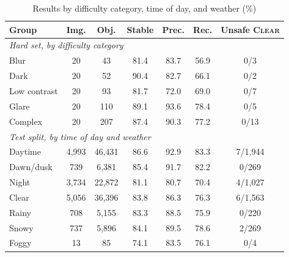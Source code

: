 \begin{table}[t]
\centering
\caption{Results by difficulty category, time of day, and weather (\%)}
\label{tab:groups}
\footnotesize
\setlength{\tabcolsep}{3pt}
\begin{tabular}{lcccccc}
\hline
Group & Img. & Obj. & Stable & Prec. & Rec. & Unsafe \textsc{Clear} \\
\hline
\multicolumn{7}{l}{\emph{Hard set, by difficulty category}} \\
Blur & 20 & 43 & 81.4 & 83.7 & 56.9 & 0/3 \\
Dark & 20 & 52 & 90.4 & 82.7 & 66.1 & 0/2 \\
Low contrast & 20 & 93 & 81.7 & 72.0 & 69.0 & 0/7 \\
Glare & 20 & 110 & 89.1 & 93.6 & 78.4 & 0/5 \\
Complex & 20 & 207 & 87.4 & 90.3 & 77.2 & 0/13 \\
\hline
\multicolumn{7}{l}{\emph{Test split, by time of day and weather}} \\
Daytime & 4{,}993 & 46{,}431 & 86.6 & 92.9 & 83.3 & 7/1{,}944 \\
Dawn/dusk & 739 & 6{,}381 & 85.4 & 91.7 & 82.2 & 0/269 \\
Night & 3{,}734 & 22{,}872 & 81.1 & 80.7 & 70.4 & 4/1{,}027 \\
Clear & 5{,}056 & 36{,}396 & 83.8 & 86.3 & 76.3 & 6/1{,}563 \\
Rainy & 708 & 5{,}155 & 83.3 & 88.5 & 75.9 & 0/220 \\
Snowy & 737 & 5{,}896 & 84.1 & 89.5 & 78.6 & 2/269 \\
Foggy & 13 & 85 & 74.1 & 83.5 & 76.1 & 0/4 \\
\hline
\end{tabular}
\end{table}
